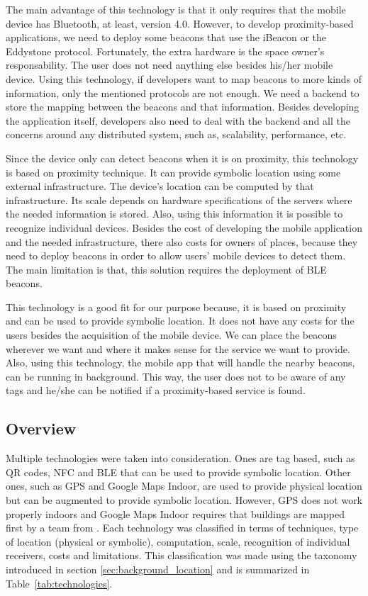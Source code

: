 The main advantage of this technology is that it only requires that the mobile device has Bluetooth, at least, version 4.0.
However, to develop proximity-based applications, we need to deploy some beacons that use the iBeacon or the Eddystone protocol.
Fortunately, the extra hardware is the space owner's responsability.
The user does not need anything else besides his/her mobile device.
Using this technology, if developers want to map beacons to more kinds of information, only the mentioned protocols are not enough.
We need a backend to store the mapping between the beacons and that information.
Besides developing the application itself, developers also need to deal with the backend and all the concerns around any distributed system, such as, scalability, performance, etc.

Since the device only can detect beacons when it is on proximity, this technology is based on proximity technique.
It can provide symbolic location using some external infrastructure.
The device's location can be computed by that infrastructure.
Its scale depends on hardware specifications of the servers where the needed information is stored.
Also, using this information it is possible to recognize individual devices.
Besides the cost of developing the mobile application and the needed infrastructure, there also costs for owners of places, because they need to deploy beacons in order to allow users' mobile devices to detect them.
The main limitation is that, this solution requires the deployment of \gls{BLE} beacons.

This technology is a good fit for our purpose because, it is based on proximity and can be used to provide symbolic location.
It does not have any costs for the users besides the acquisition of the mobile device.
We can place the beacons wherever we want and where it makes sense for the service we want to provide.
Also, using this technology, the mobile app that will handle the nearby beacons, can be running in background.
This way, the user does not to be aware of any tags and he/she can be notified if a proximity-based service is found.

\subsection{Overview}
\label{sub:background_overview}
Multiple technologies were taken into consideration.
Ones are tag based, such as \gls{QR} codes, \gls{NFC} and \gls{BLE} that can be used to provide symbolic location.
Other ones, such as \gls{GPS} and Google Maps Indoor, are used to provide physical location but can be augmented to provide symbolic location.
However, \gls{GPS} does not work properly indoors and Google Maps Indoor requires that buildings are mapped first by a team from .
Each technology was classified in terms of techniques, type of location (physical or symbolic), computation, scale, recognition of individual receivers, costs and limitations.
This classification was made using the taxonomy introduced in section \ref{sec:background_location} and is summarized in Table~\ref{tab:technologies}.

